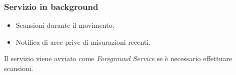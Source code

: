 \documentclass{beamer}
\begin{document}
\begin{frame}
    \frametitle{Servizio in background}

    \begin{itemize}
        \item Scansioni durante il movimento.
        \item Notifica di aree prive di misurazioni recenti.
    \end{itemize}

    Il servizio viene avviato come \textit{Foreground Service} se è necessario effettuare scansioni.

    \begin{figure}[H]
        \hspace*{1cm}
    \end{figure}
\end{frame}
\end{document}
